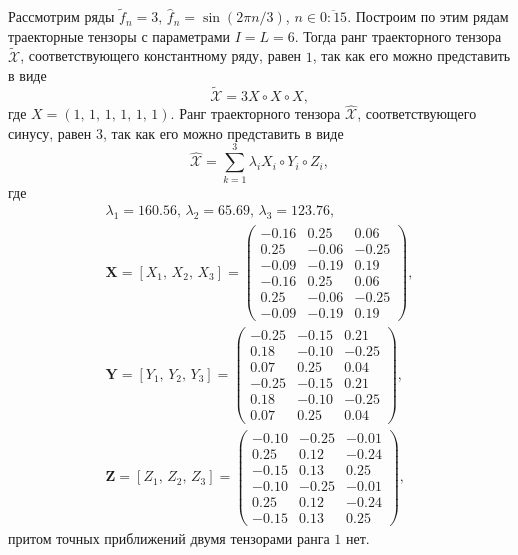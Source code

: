 \documentclass[specialist,
    substylefile = spbu_report.rtx,
    subf,href,colorlinks=true, 12pt]{disser}
\theoremstyle{plain}
\theoremstyle{definition}
\theoremstyle{remark}
\begin{document}
    Рассмотрим ряды $\tilde{f}_n=3,\, \hat{f}_n=\sin(2\pi n / 3)$, $n \in \overline{0:15}$.
    Построим по этим рядам траекторные тензоры с параметрами $I=L=6$.
    Тогда ранг траекторного тензора $\tilde{\mathcal{X}}$, соответствующего константному ряду, равен $1$, так как его
    можно представить в виде
    \[
        \tilde{\mathcal{X}} = 3 X\circ X \circ X,
    \]
    где $X=(1,\, 1,\, 1,\, 1,\, 1,\, 1)$.
    Ранг траекторного тензора $\hat{\mathcal{X}}$, соответствующего синусу, равен $3$, так как его можно представить в виде
    \[
        \hat{\mathcal{X}}=\sum_{k=1}^{3}\lambda_i X_i \circ Y_i\circ Z_i,
    \]
    где
    \begin{gather*}
        \lambda_1 =160.56,\, \lambda_2 =65.69,\, \lambda_3 =123.76,\\
        \mathbf{X}=[X_1,\, X_2,\, X_3] =
        \begin{pmatrix}
            -0.16 & 0.25  & 0.06  \\
            0.25  & -0.06 & -0.25 \\
            -0.09 & -0.19 & 0.19  \\
            -0.16 & 0.25  & 0.06  \\
            0.25  & -0.06 & -0.25 \\
            -0.09 & -0.19 & 0.19
        \end{pmatrix},\\
        \mathbf{Y}=[Y_1,\, Y_2,\, Y_3] =
        \begin{pmatrix}
            -0.25 & -0.15 & 0.21  \\
            0.18  & -0.10 & -0.25 \\
            0.07  & 0.25  & 0.04  \\
            -0.25 & -0.15 & 0.21  \\
            0.18  & -0.10 & -0.25 \\
            0.07  & 0.25  & 0.04
        \end{pmatrix},\\
        \mathbf{Z}=[Z_1,\, Z_2,\, Z_3] =
        \begin{pmatrix}
            -0.10 & -0.25 & -0.01 \\
            0.25  & 0.12  & -0.24 \\
            -0.15 & 0.13  & 0.25  \\
            -0.10 & -0.25 & -0.01 \\
            0.25  & 0.12  & -0.24 \\
            -0.15 & 0.13  & 0.25
        \end{pmatrix},
    \end{gather*}
    притом точных приближений двумя тензорами ранга $1$ нет.
\end{document}
